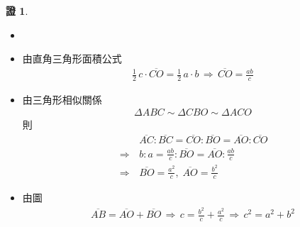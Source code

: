 \documentclass[14pt]{extarticle}
\newcommand{\ie}{\,\Longrightarrow\,}
\theoremstyle{definition}
\newtheorem*{prf}{證}
\begin{document}
\begin{prf}
  \begin{itemize}
    \item[]
    \item 由直角三角形面積公式 
      \begin{align*}
        \frac{1}{2}\,c\cdot\overline{CO} = \frac{1}{2}\,a\cdot b\ie\overline{CO} = \frac{ab}{c}
      \end{align*}
    \item 由三角形相似關係
      \begin{align*}
        \Delta ABC\sim\Delta CBO\sim\Delta ACO
      \end{align*}
      則 
      \begin{align*}
        &\overline{AC}:\overline{BC} = \overline{CO}:\overline{BO} = \overline{AO}:\overline{CO} \\
        \ie& b:a = \frac{ab}{c}: \overline{BO} = \overline{AO}: \frac{ab}{c} \\
        \ie& \overline{BO} = \frac{a^2}{c},\;\overline{AO} = \frac{b^2}{c}
      \end{align*}
    \item 由圖
      \begin{align*}
        \overline{AB} = \overline{AO} + \overline{BO} \ie c = \frac{b^2}{c} + \frac{a^2}{c}\ie c^2 = a^2 + b^2
      \end{align*}
  \end{itemize}
\end{prf}
  
\end{document}
